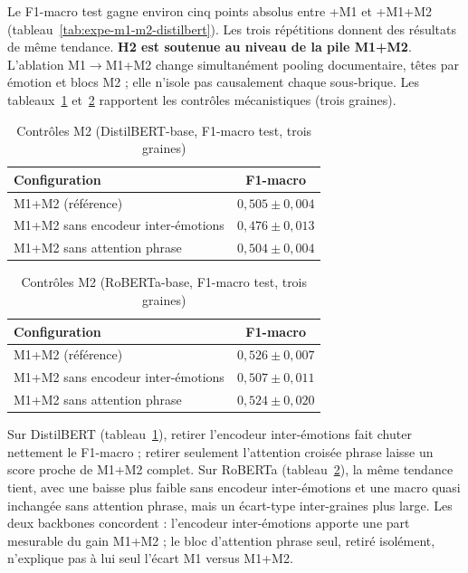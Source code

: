 Le F1-macro test gagne environ cinq points absolus entre +M1 et +M1+M2
(tableau~\ref{tab:expe-m1-m2-distilbert}). Les trois répétitions donnent
des résultats de même tendance.
\textbf{H2 est soutenue au niveau de la pile M1+M2}. L'ablation
M1$\to$M1+M2 change simultanément pooling
documentaire, têtes par émotion et blocs M2 ; elle n'isole pas
causalement chaque sous-brique. Les
tableaux~\ref{tab:expe-m2-controls} et~\ref{tab:expe-m2-controls-roberta}
rapportent les contrôles mécanistiques (trois graines).

\begin{table}[H]
\centering
\caption{Contrôles M2 (DistilBERT-base, F1-macro test, trois graines)}
\label{tab:expe-m2-controls}
\renewcommand{\arraystretch}{1.2}
\begin{tabular}{|p{7.5cm}|c|}
\hline
\textbf{Configuration} & \textbf{F1-macro} \\
\hline
M1+M2 (référence) & $0{,}505 \pm 0{,}004$ \\
\hline
M1+M2 sans encodeur inter-émotions & $0{,}476 \pm 0{,}013$ \\
\hline
M1+M2 sans attention phrase & $0{,}504 \pm 0{,}004$ \\
\hline
\end{tabular}
\end{table}

\begin{table}[H]
\centering
\caption{Contrôles M2 (RoBERTa-base, F1-macro test, trois graines)}
\label{tab:expe-m2-controls-roberta}
\renewcommand{\arraystretch}{1.2}
\begin{tabular}{|p{7.5cm}|c|}
\hline
\textbf{Configuration} & \textbf{F1-macro} \\
\hline
M1+M2 (référence) & $0{,}526 \pm 0{,}007$ \\
\hline
M1+M2 sans encodeur inter-émotions & $0{,}507 \pm 0{,}011$ \\
\hline
M1+M2 sans attention phrase & $0{,}524 \pm 0{,}020$ \\
\hline
\end{tabular}
\end{table}

Sur DistilBERT (tableau~\ref{tab:expe-m2-controls}), retirer l'encodeur
inter-émotions fait chuter nettement le F1-macro ; retirer seulement
l'attention croisée phrase laisse un score proche de M1+M2 complet.
Sur RoBERTa (tableau~\ref{tab:expe-m2-controls-roberta}), la même
tendance tient, avec une baisse plus faible sans encodeur
inter-émotions et une macro quasi inchangée sans attention phrase, mais
un écart-type inter-graines plus large. Les deux backbones concordent :
l'encodeur inter-émotions apporte une part mesurable du gain M1+M2 ; le
bloc d'attention phrase seul, retiré isolément, n'explique pas à lui
seul l'écart M1 versus M1+M2.

